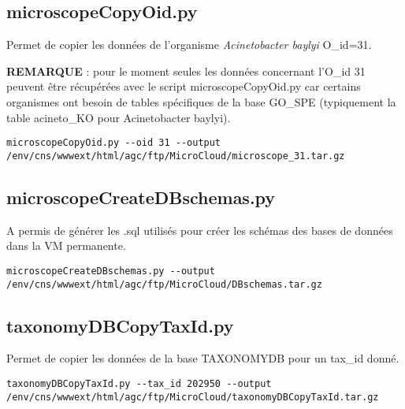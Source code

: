 \subsection{microscopeCopyOid.py}
Permet de copier les données de l'organisme \textit{Acinetobacter baylyi} O\_id=31. 

\begin{mycolorbox}\textbf{REMARQUE} : pour le moment seules les données concernant l'O\_id 31 peuvent être récupérées avec le script microscopeCopyOid.py car certains organismes ont besoin de tables spécifiques de la base GO\_SPE (typiquement la table acineto\_KO pour Acinetobacter baylyi).
\end{mycolorbox}

\begin{lstlisting}[style=bash]
microscopeCopyOid.py --oid 31 --output /env/cns/wwwext/html/agc/ftp/MicroCloud/microscope_31.tar.gz
\end{lstlisting}

\subsection{microscopeCreateDBschemas.py}
A permis de générer les .sql utilisés pour créer les schémas des bases de données dans la VM permanente.

\begin{lstlisting}[style=bash]
microscopeCreateDBschemas.py --output /env/cns/wwwext/html/agc/ftp/MicroCloud/DBschemas.tar.gz
\end{lstlisting}

\subsection{taxonomyDBCopyTaxId.py}
Permet de copier les données de la base TAXONOMYDB pour un tax\_id donné.

\begin{lstlisting}[style=bash]
taxonomyDBCopyTaxId.py --tax_id 202950 --output /env/cns/wwwext/html/agc/ftp/MicroCloud/taxonomyDBCopyTaxId.tar.gz
\end{lstlisting}